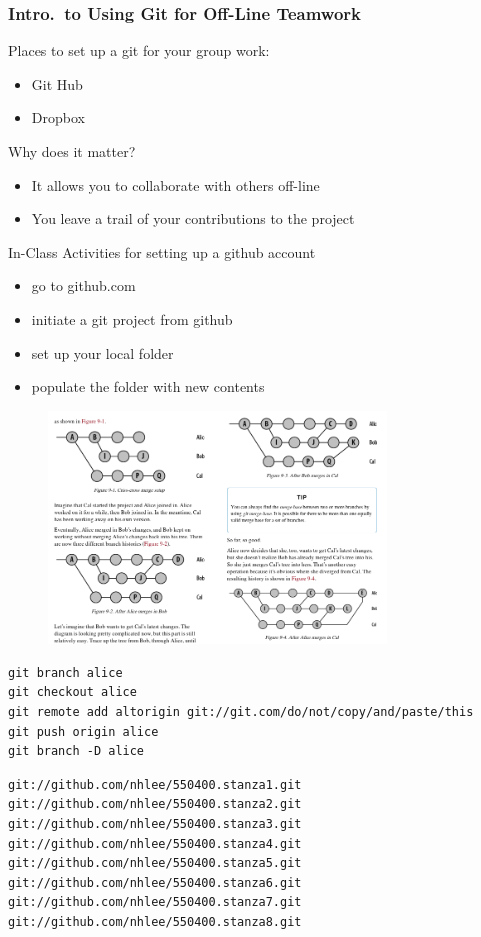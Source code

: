 \documentclass[hyperref={colorlinks=false},handout,10pt]{beamer}
\let\olditem\item
\renewcommand{\item}{\setlength{\itemsep}{0.5\baselineskip}\olditem}
\begin{document}
\begin{frame}
    \frametitle{Intro.\ to Using Git for Off-Line Teamwork}
    Places to set up a git for your group work: 
    \begin{itemize}
        \item Git Hub
        \item Dropbox
    \end{itemize}
    Why does it matter?
    \begin{itemize}
        \item It allows you to collaborate with others off-line
        \item You leave a trail of your contributions to the project
    \end{itemize}
    \begin{block}
        {In-Class Activities for setting up a github account}
        \begin{itemize}
            \item go to github.com
            \item initiate a git project from github
            \item set up your local folder 
            \item populate the folder with new contents
        \end{itemize}
    \end{block}
    \begin{figure}
        \begin{center}
            \includegraphics[width=0.8\textwidth]{images/gitmergeexample.png}
        \end{center}
    \end{figure}
    \begin{lstlisting}
git branch alice 
git checkout alice
git remote add altorigin git://git.com/do/not/copy/and/paste/this
git push origin alice
git branch -D alice
    \end{lstlisting}

    \begin{lstlisting}
git://github.com/nhlee/550400.stanza1.git 
git://github.com/nhlee/550400.stanza2.git 
git://github.com/nhlee/550400.stanza3.git 
git://github.com/nhlee/550400.stanza4.git 
git://github.com/nhlee/550400.stanza5.git 
git://github.com/nhlee/550400.stanza6.git 
git://github.com/nhlee/550400.stanza7.git 
git://github.com/nhlee/550400.stanza8.git 
    \end{lstlisting}
\end{frame}
\end{document}
